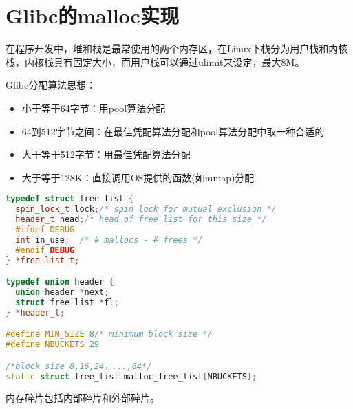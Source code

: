 \section{Glibc的malloc实现}
\label{sec:glibc-malloc}

在程序开发中，堆和栈是最常使用的两个内存区，在Linux下栈分为用户栈和内核栈，内核栈具有固定大小，而用户栈可以通过ulimit来设定，最大8M。

Glibc分配算法思想：
\begin{itemize}
\item 小于等于64字节：用pool算法分配
\item 64到512字节之间：在最佳凭配算法分配和pool算法分配中取一种合适的
\item 大于等于512字节：用最佳凭配算法分配
\item 大于等于128K：直接调用OS提供的函数(如mmap)分配
\end{itemize}

\begin{lstlisting}[language=C++]
typedef struct free_list {
  spin_lock_t lock;/* spin lock for mutual exclusion */
  header_t head;/* head of free list for this size */
  #ifdef DEBUG
  int in_use;  /* # mallocs - # frees */
  #endif DEBUG
} *free_list_t;

typedef union header {
  union header *next;
  struct free_list *fl;
} *header_t;

#define MIN_SIZE 8/* minimum block size */
#define NBUCKETS 29

/*block size 8,16,24，...,64*/
static struct free_list malloc_free_list[NBUCKETS];
\end{lstlisting}

内存碎片包括内部碎片和外部碎片。














